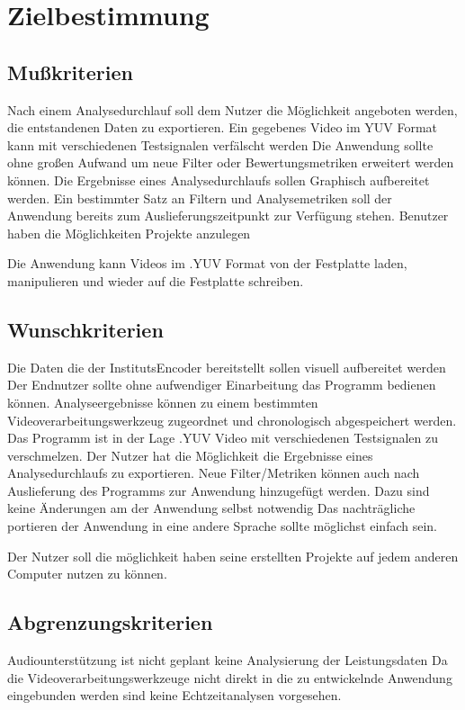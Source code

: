\chapter{Zielbestimmung}

\section{Mußkriterien}

\newItemMK Nach einem Analysedurchlauf soll dem Nutzer die Möglichkeit angeboten werden, die entstandenen Daten zu exportieren. %
\newItemMK Ein gegebenes Video im YUV Format kann mit verschiedenen Testsignalen verfälscht werden %
\newItemMK Die Anwendung sollte ohne großen Aufwand um neue Filter oder Bewertungsmetriken erweitert werden können. %
\newItemMK Die Ergebnisse eines Analysedurchlaufs sollen Graphisch aufbereitet werden. %
\newItemMK Ein bestimmter Satz an Filtern und Analysemetriken soll der Anwendung bereits zum Auslieferungszeitpunkt zur Verfügung stehen.
\newItemMK Benutzer haben die Möglichkeiten Projekte anzulegen %

\newItemMK Die Anwendung kann Videos im .YUV Format von der Festplatte laden, manipulieren und wieder auf die Festplatte schreiben. %


\setcounter{enumi}{0}

\section{Wunschkriterien}

\newItemWK Die Daten die der InstitutsEncoder bereitstellt sollen visuell aufbereitet werden
\newItemWK Der Endnutzer sollte ohne aufwendiger Einarbeitung das Programm bedienen können.
\newItemWK Analyseergebnisse können zu einem bestimmten Videoverarbeitungswerkzeug zugeordnet und chronologisch abgespeichert werden.
\newItemWK Das Programm ist in der Lage .YUV Video mit verschiedenen Testsignalen zu verschmelzen.
\newItemWK Der Nutzer hat die Möglichkeit die Ergebnisse eines Analysedurchlaufs zu exportieren.
\newItemWK Neue Filter/Metriken können auch nach Auslieferung des Programms zur Anwendung hinzugefügt werden. Dazu
  sind keine Änderungen am der Anwendung selbst notwendig
\newItemWK Das nachträgliche portieren der Anwendung in eine andere Sprache sollte möglichst einfach sein.

\newItemWK Der Nutzer soll die möglichkeit haben seine erstellten Projekte auf jedem anderen Computer nutzen zu können.

\setcounter{enumi}{0}

\section{Abgrenzungskriterien}

\newItemAK Audiounterstützung ist nicht geplant
\newItemAK keine Analysierung der Leistungsdaten
\newItemAK Da die Videoverarbeitungswerkzeuge nicht direkt in die zu entwickelnde Anwendung eingebunden werden sind keine Echtzeitanalysen vorgesehen.


\setcounter{enumi}{0}

